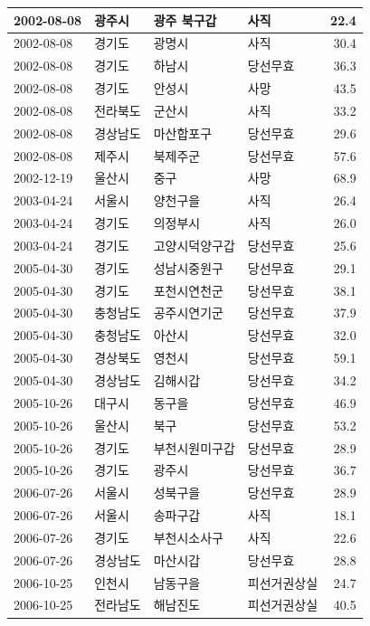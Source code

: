 \documentclass[
  11pt,
  letter]{article}
\begin{document}
\begin{longtable}[t]{l|l|l|l|r}
\hline
2002-08-08 & 광주시 & 광주 북구갑 & 사직 & 22.4\\
\hline
2002-08-08 & 경기도 & 광명시 & 사직 & 30.4\\
\hline
2002-08-08 & 경기도 & 하남시 & 당선무효 & 36.3\\
\hline
2002-08-08 & 경기도 & 안성시 & 사망 & 43.5\\
\hline
2002-08-08 & 전라북도 & 군산시 & 사직 & 33.2\\
\hline
2002-08-08 & 경상남도 & 마산합포구 & 당선무효 & 29.6\\
\hline
2002-08-08 & 제주시 & 북제주군 & 당선무효 & 57.6\\
\hline
2002-12-19 & 울산시 & 중구 & 사망 & 68.9\\
\hline
2003-04-24 & 서울시 & 양천구을 & 사직 & 26.4\\
\hline
2003-04-24 & 경기도 & 의정부시 & 사직 & 26.0\\
\hline
2003-04-24 & 경기도 & 고양시덕양구갑 & 당선무효 & 25.6\\
\hline
2005-04-30 & 경기도 & 성남시중원구 & 당선무효 & 29.1\\
\hline
2005-04-30 & 경기도 & 포천시연천군 & 당선무효 & 38.1\\
\hline
2005-04-30 & 충청남도 & 공주시연기군 & 당선무효 & 37.9\\
\hline
2005-04-30 & 충청남도 & 아산시 & 당선무효 & 32.0\\
\hline
2005-04-30 & 경상북도 & 영천시 & 당선무효 & 59.1\\
\hline
2005-04-30 & 경상남도 & 김해시갑 & 당선무효 & 34.2\\
\hline
2005-10-26 & 대구시 & 동구을 & 당선무효 & 46.9\\
\hline
2005-10-26 & 울산시 & 북구 & 당선무효 & 53.2\\
\hline
2005-10-26 & 경기도 & 부천시원미구갑 & 당선무효 & 28.9\\
\hline
2005-10-26 & 경기도 & 광주시 & 당선무효 & 36.7\\
\hline
2006-07-26 & 서울시 & 성북구을 & 당선무효 & 28.9\\
\hline
2006-07-26 & 서울시 & 송파구갑 & 사직 & 18.1\\
\hline
2006-07-26 & 경기도 & 부천시소사구 & 사직 & 22.6\\
\hline
2006-07-26 & 경상남도 & 마산시갑 & 당선무효 & 28.8\\
\hline
2006-10-25 & 인천시 & 남동구을 & 피선거권상실 & 24.7\\
\hline
2006-10-25 & 전라남도 & 해남진도 & 피선거권상실 & 40.5\\

\end{longtable}
\end{document}
